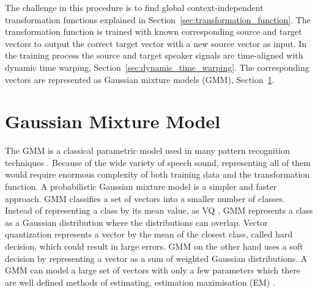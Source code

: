 The challenge in this procedure is to find global context-independent transformation functions explained in Section~\ref{sec:transformation_function}. The transformation function is trained with known corresponding source and target vectors to output the correct target vector with a new source vector as input. In the training process the source and target speaker signals are time-aligned with dynamic time warping, Section~\ref{sec:dynamic_time_warping}. The corresponding vectors are represented as Gaussian mixture models (GMM), Section~\ref{sec:gaussian_mixture_model}.




\section{Gaussian Mixture Model} %
\label{sec:gaussian_mixture_model}
The GMM is a classical parametric model used in many pattern recognition techniques \cite{stylianou98}. Because of the wide variety of speech sound, representing all of them would require enormous complexity of both training data and the transformation function. A probabilistic Gaussian mixture model is a simpler and faster approach. GMM classifies a set of vectors into a smaller number of classes. Instead of representing a class by its mean value, as VQ , GMM represents a class as a Gaussian distribution where the distributions can overlap. Vector quantization represents a vector by the mean of the closest class, called hard decision, which could result in large errors. GMM on the other hand uses a soft decision by representing a vector as a sum of weighted Gaussian distributions. A GMM can model a large set of vectors with only a few parameters which there are well defined methods of estimating, \eg estimation maximisation (EM) \cite{taletek}.

